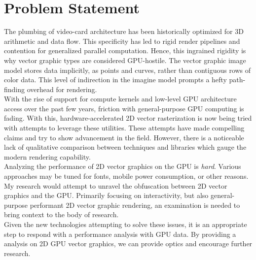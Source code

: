 \section{Problem Statement}

The plumbing of video-card architecture has been historically optimized for 3D arithmetic and data flow. This specificity has led to rigid render pipelines and contention for generalized parallel computation. Hence, this ingrained rigidity is why vector graphic types are considered GPU-hostile. The vector graphic image model stores data implicitly, as points and curves, rather than contiguous rows of color data. This level of indirection in the imagine model prompts a hefty path-finding overhead for rendering.\\

With the rise of support for compute kernels and low-level GPU architecture access over the past few years, friction with general-purpose GPU computing is fading. With this, hardware-accelerated 2D vector rasterization is now being tried with attempts to leverage these utilities. These attempts have made compelling claims and try to show advancement in the field. However, there is a noticeable lack of qualitative comparison between techniques and libraries which gauge the modern rendering capability.\\

Analyzing the performance of 2D vector graphics on the GPU is \emph{hard}. Various approaches may be tuned for fonts, mobile power consumption, or other reasons. My research would attempt to unravel the obfuscation between 2D vector graphics and the GPU. Primarily focusing on interactivity, but also general-purpose performant 2D vector graphic rendering, an examination is needed to bring context to the body of research.\\

Given the new technologies attempting to solve these issues, it is an appropriate step to respond with a performance analysis with GPU data. By providing a analysis on 2D GPU vector graphics, we can provide optics and encourage further research.